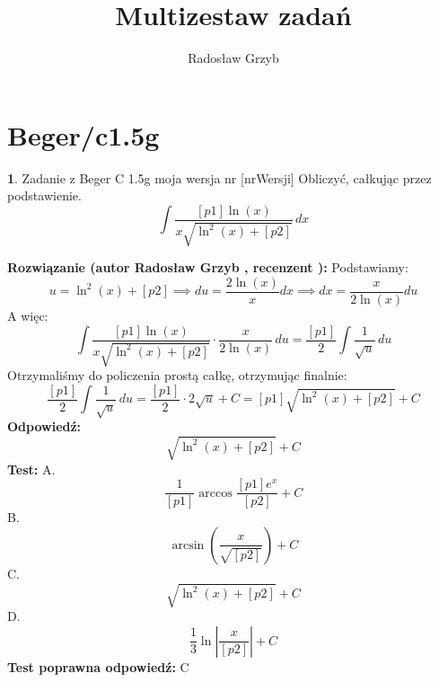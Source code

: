 \documentclass[12pt, a4paper]{article}
\title{Multizestaw zadań}
\author{Radosław Grzyb}
\date{}
\theoremstyle{definition} %
\newtheorem{zad}{}
\newcommand{\kategoria}[1]{\section{#1}} %
\newcommand{\zadStart}[1]{\begin{zad}#1\newline} %
\newcommand{\zadStop}{\end{zad}}   %
\newcommand{\rozwStart}[2]{\noindent \textbf{Rozwiązanie (autor #1 , recenzent #2): }\newline} %
\newcommand{\rozwStop}{\newline}                                            %
\newcommand{\odpStart}{\noindent \textbf{Odpowiedź:}\newline}    %
\newcommand{\odpStop}{\newline}                                             %
\newcommand{\testStart}{\noindent \textbf{Test:}\newline} %
\newcommand{\testStop}{\newline} %
\newcommand{\kluczStart}{\noindent \textbf{Test poprawna odpowiedź:}\newline} %
\newcommand{\kluczStop}{\newline} %
\begin{document}
\maketitle
\kategoria{Beger/c1.5g}
\zadStart{Zadanie z Beger C 1.5g moja wersja nr [nrWersji]}
Obliczyć, całkując przez podstawienie.
$$\int \frac{[p1]\ln(x)}{x\sqrt{\ln^{2}(x)+[p2]}} \,dx$$
\zadStop
\rozwStart{Radosław Grzyb}{}
Podstawiamy:
$$u=\ln^{2}(x)+[p2] \implies du=\frac{2\ln(x)}{x}dx \implies dx=\frac{x}{2\ln(x)}du$$
A więc:
$$\int \frac{[p1]\ln(x)}{x\sqrt{\ln^{2}(x)+[p2]}}\cdot\frac{x}{2\ln(x)} \,du=\frac{[p1]}{2}\int \frac{1}{\sqrt{u}} \,du$$
Otrzymaliśmy do policzenia prostą całkę, otrzymując finalnie:
$$\frac{[p1]}{2}\int \frac{1}{\sqrt{u}} \,du=\frac{[p1]}{2}\cdot2 \sqrt{u}+C=[p1]\sqrt{\ln^{2}(x)+[p2]}+C$$
\rozwStop
\odpStart
$$\sqrt{\ln^{2}(x)+[p2]}+C$$
\odpStop
\testStart
A.$$\frac{1}{[p1]}\arccos\frac{[p1]e^{x}}{[p2]}+C$$
B.$$\arcsin(\frac{x}{\sqrt{[p2]}})+C$$
C.$$\sqrt{\ln^{2}(x)+[p2]}+C$$
D.$$\frac{1}{3}\ln|\frac{x}{[p2]}|+C$$
\testStop
\kluczStart
C
\kluczStop
\end{document}
